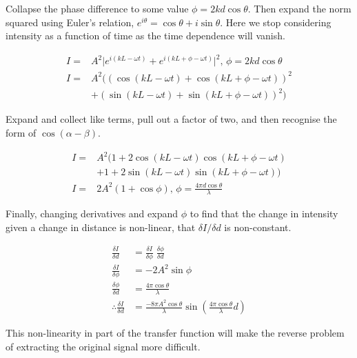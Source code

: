 \documentclass[paper-main.tex]{subfiles}
\begin{document}
Collapse the phase difference to some value $\phi = 2 k d \cos{\theta}$. Then expand the norm squared using Euler’s relation, $e^{i \theta} = \cos{\theta} + i \sin{\theta}$. Here we stop considering intensity as a function of time as the time dependence will vanish.

\begin{align}    
    I =& A^2 \lvert e^{i (k L - \omega t)} + e^{i (k L + \phi - \omega t)} \rvert^2,\, \phi = 2 k d \cos{\theta} \\
    I =& A^2 ((\cos{(k L - \omega t)} + \cos{(k L + \phi - \omega t)})^2 \nonumber\\ &+ (\sin{(k L - \omega t)} + \sin{(k L + \phi - \omega t)})^2)
\end{align}

Expand and collect like terms, pull out a factor of two, and then recognise the form of $\cos{(\alpha-\beta)}$.

\begin{align}
    I =& A^2 (1 + 2 \cos{(k L - \omega t)} \cos{(k L + \phi - \omega t)} \nonumber\\&+ 1 + 2 \sin{(k L - \omega t)} \sin{(k L + \phi - \omega t)}) \\
    I =& 2 A^2 (1 + \cos{\phi}),\, \phi = \frac{4 \pi d \cos{\theta}}{\lambda}
\end{align}

Finally, changing derivatives and expand $\phi$ to find that the change in intensity given a change in distance is non-linear, that ${\delta I}/{\delta d}$ is non-constant.

\begin{align}    
    \frac{\delta I}{\delta d} &= \frac{\delta I}{\delta \phi}\; \frac{\delta \phi}{\delta d}\\
    \frac{\delta I}{\delta\phi} &= - 2 A^2 \sin{\phi}\\
    \frac{\delta\phi}{\delta d} &= \frac{4 \pi \cos{\theta}}{\lambda}\\
    \therefore \frac{\delta I}{\delta d} &= \frac{- 8 \pi A^2 \cos{\theta}}{\lambda} \sin{(\frac{4 \pi \cos{\theta}}{\lambda} d)}
\end{align}

This non-linearity in part of the transfer function will make the reverse problem of extracting the original signal more difficult.
\end{document}
